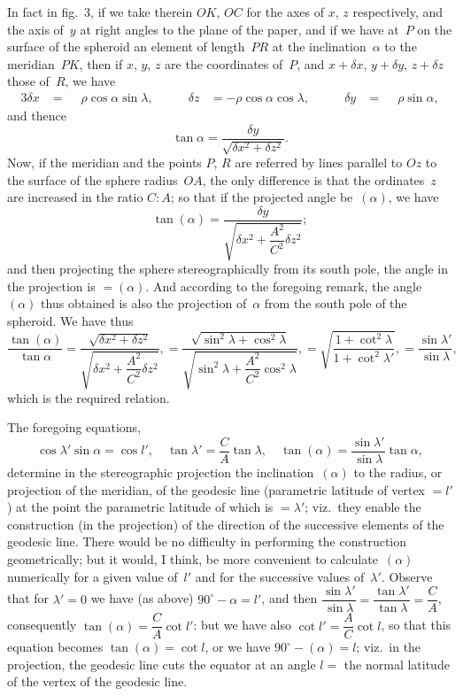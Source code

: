 \documentclass[11pt,a4paper]{article}
\theoremstyle{plain}
\theoremstyle{definition}
\begin{document}
In fact in fig.~3, if we take therein $OK$, $OC$ for the axes of $x$, $z$ respectively,
and the axis of~$y$ at right angles to the plane of the paper, and if we have at~$P$
on the surface of the spheroid an element of length~$PR$ at the inclination~$\alpha$ to the
meridian~$PK$, then if $x$, $y$, $z$ are the coordinates of~$P$, and $x+\delta x$, $y+\delta y$, $z+\delta z$ those
of~$R$, we have
\begin{alignat*}{3}
\delta x &= \phantom{-}\rho\cos\alpha\sin\lambda, &\qquad
\delta z &= -\rho\cos\alpha\cos\lambda, &\qquad
\delta y &= \phantom{-}\rho\sin\alpha,
\end{alignat*}
and thence
\[
\tan\alpha = \frac{\delta y}{\sqrt{\delta x^2 + \delta z^2}}.
\]
Now, if the meridian and the points $P$, $R$ are referred by lines parallel to $Oz$ to the
surface of the sphere radius~$OA$, the only difference is that the ordinates~$z$ are
increased in the ratio $C:A$; so that if the projected angle be~$(\alpha)$, we have
\[
\tan{(\alpha)} = \frac{\delta y}{\sqrt{\delta x^2 + \dfrac{A^2}{C^2}\delta z^2}};
\]
and then projecting the sphere stereographically from its south pole, the angle in the
projection is $=(\alpha)$.  And according to the foregoing remark, the angle~$(\alpha)$ thus obtained
is also the projection of~$\alpha$ from the south pole of the spheroid.  We have thus
\[
\frac{\tan{(\alpha)}}{\tan\alpha}
= \frac{\sqrt{\delta x^2 + \delta z^2}}{\sqrt{\delta x^2 + \dfrac{A^2}{C^2}\delta z^2}},
= \frac{\sqrt{\sin^2\lambda + \cos^2\lambda}}
{\sqrt{\sin^2\lambda + \dfrac{A^2}{C^2}\cos^2\lambda}},
= \sqrt{\frac{1+\cot^2\lambda}{1+\cot^2\lambda'}},
= \frac{\sin\lambda'}{\sin\lambda},
\]
which is the required relation.

The foregoing equations,
\[
\cos\lambda'\sin\alpha = \cos l', \quad
\tan\lambda' = \frac{C}{A}\tan\lambda, \quad
\tan{(\alpha)} = \frac{\sin\lambda'}{\sin\lambda}\tan\alpha,
\]
determine in the stereographic projection the inclination~$(\alpha)$ to the radius, or projection
of the meridian, of the geodesic line (parametric latitude of vertex $=l'$) at the point
the parametric latitude of which is $=\lambda'$; viz.\ they enable the construction (in the
projection) of the direction of the successive elements of the geodesic line.  There
would be no difficulty in performing the construction geometrically; but it would,
I think, be more convenient to calculate~$(\alpha)$ numerically for a given value of~$l'$ and
for the successive values of~$\lambda'$.  Observe that for $\lambda'=0$ we have (as above) $90^\circ-\alpha=l'$,
and then $\dfrac{\sin\lambda'}{\sin\lambda} = \dfrac{\tan\lambda'}{\tan\lambda} = \dfrac{C}{A}$, consequently $\tan{(\alpha)} = \dfrac{C}{A}\cot l'$: but we have also
$\cot l' = \dfrac{A}{C}\cot l$, so that this equation becomes $\tan{(\alpha)} = \cot l$, or we have $90^\circ-(\alpha)=l$;
viz.\ in the projection, the geodesic line cuts the equator at an angle $l=$ the normal
latitude of the vertex of the geodesic line.
\end{document}
